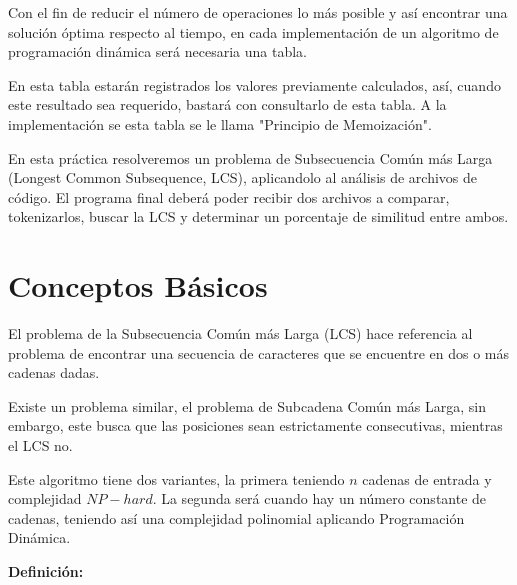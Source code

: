\documentclass[12pt,twoside]{article}
\begin{document}
Con el fin de reducir el n\'umero de operaciones lo m\'as posible y as\'i encontrar una soluci\'on \'optima respecto al tiempo, en cada implementaci\'on de un algoritmo de programaci\'on din\'amica ser\'a necesaria una tabla.

\vspace{5mm} %

En esta tabla estar\'an registrados los valores previamente calculados, as\'i, cuando este resultado sea requerido, bastar\'a con consultarlo de esta tabla. A la implementaci\'on se esta tabla se le llama "Principio de Memoizaci\'on". 

\vspace{5mm} %

En esta pr\'actica resolveremos un problema de Subsecuencia Com\'un m\'as Larga (Longest Common Subsequence, LCS), aplicandolo al an\'alisis de archivos de c\'odigo. El programa final deber\'a poder recibir dos archivos a comparar, tokenizarlos, buscar la LCS y determinar un porcentaje de similitud entre ambos.

\section{Conceptos B\'asicos}

\vspace{5mm} %

El problema de la Subsecuencia Com\'un m\'as Larga (LCS) hace referencia al problema de encontrar una secuencia de caracteres que se encuentre en dos o m\'as cadenas dadas. 

\vspace{5mm} %

Existe un problema similar, el problema de Subcadena Com\'un m\'as Larga, sin embargo, este busca que las posiciones sean estrictamente consecutivas, mientras el LCS no. 

\vspace{5mm} %

Este algoritmo tiene dos variantes, la primera teniendo $n$ cadenas de entrada y complejidad $NP-hard$. La segunda ser\'a cuando hay un n\'umero constante de cadenas, teniendo as\'i una complejidad polinomial aplicando Programaci\'on Din\'amica. 

\vspace{5mm} %

{\bf Definici\'on: }
\vspace{5mm} %
\end{document}
